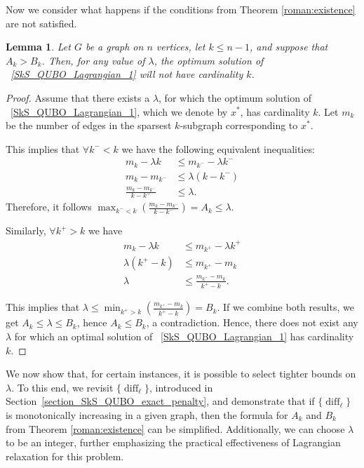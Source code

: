 \documentclass{article}
\DeclareMathOperator{\diff}{diff}
\newtheorem{lem}[thm]{Lemma}
\begin{document}
Now we consider what happens if the conditions from Theorem \ref{roman:existence} are not satisfied.

\begin{lem} \label{lem: A_k_>B_k}
    Let $G$ be a graph on $n$ vertices, let $k \leq n - 1$, and suppose that $A_k > B_k$. Then, for any value of $\lambda$, the optimum solution of ~\eqref{SkS_QUBO_Lagrangian_1} will not have cardinality $k$.
\end{lem}

\begin{proof}
    Assume that there exists a $\lambda$, for which the optimum solution of ~\eqref{SkS_QUBO_Lagrangian_1}, which we denote by $x^*$, has cardinality $k$. Let $m_k$ be the number of edges in the sparsest $k$-subgraph corresponding to $x^*$.
    
    This implies that $\forall k^- < k$ we have the following equivalent inequalities:
    \begin{align*}
        m_k - \lambda k &\le m_{k^-} - \lambda k^-  \\
        m_k - m_{k^-} &\le \lambda (k - k^-) \\
        \frac{m_k - m_{k^-}}{k - k^-} & \le \lambda .
    \end{align*}
    Therefore, it follows $ \max_{k^- < k} \left( \frac{m_k - m_{k^-}}{k - k^-} \right) = A_k \le \lambda$. 
    
    Similarly,  $\forall k^+ > k$ we have
    \begin{align*}
        m_k - \lambda k &\le m_{k^+} - \lambda k^+  \\
        \lambda (k^+ - k) &\le m_{k^+} - m_k \\
        \lambda &\le \frac{m_{k^+} - m_k}{k^+ - k} .
    \end{align*}

    This implies that $ \lambda \le \min_{k^+ > k} \left( \frac{m_{k^+} - m_k}{k^+ - k} \right) = B_k$. If we combine both results, we get  $A_k \le \lambda \le B_k$, hence $ A_k \le B_k$, a contradiction. Hence, there does not exist any $\lambda$ for which an optimal solution of ~\eqref{SkS_QUBO_Lagrangian_1} has  cardinality $k$.
\end{proof}

We now show that, for certain instances, it is possible to select tighter bounds on $\lambda$. 
To this end, we revisit 
$\{\diff_\ell\}$, introduced in Section~\ref{section_SkS_QUBO_exact_penalty}, and demonstrate that if $\{\diff_\ell\}$ is monotonically increasing in a given graph, then the formula for  $A_k$ and $B_k$ from Theorem \ref{roman:existence} can be simplified.
  Additionally, we can choose $\lambda$ to be an integer, further emphasizing the practical effectiveness of Lagrangian relaxation for this problem.\\
\end{document}
